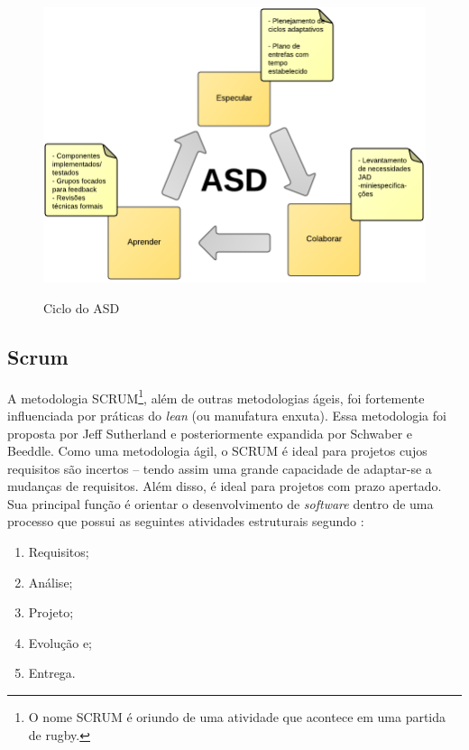 \begin{figure}[htb!]
\begin{center}
\caption{Ciclo do ASD}
\label{fig:asd}
\includegraphics[width=13cm]{assets/asd} \\
\end{center}
\end{figure}

\subsection{Scrum}
\label{sec:scrum}

A metodologia SCRUM\footnote{O nome SCRUM é oriundo de uma atividade que acontece em uma partida de rugby.}, além de outras metodologias ágeis, foi fortemente influenciada por práticas do \textit{lean} (ou manufatura enxuta). Essa metodologia foi proposta por Jeff Sutherland e posteriormente expandida por Schwaber e Beeddle. Como uma metodologia ágil, o SCRUM é ideal para projetos cujos requisitos são incertos -- tendo assim uma grande capacidade de adaptar-se a mudanças de requisitos. Além disso, é ideal para projetos com prazo apertado. Sua principal função é orientar o desenvolvimento de \textit{software} dentro de uma processo que possui as seguintes atividades estruturais segundo :

\begin{enumerate}
	\item Requisitos;
	\item Análise;
	\item Projeto;
	\item Evolução e;
	\item Entrega.
\end{enumerate}

